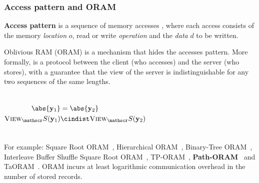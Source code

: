 	\begin{frame}[label={frame:appendix:oram}]

		\frametitle{Access pattern and ORAM}

		\justifying%

		\textbf{Access pattern} is a sequence of memory accesses \oramProgram{}, where each access consists of the memory \emph{location} $o$, read \oramRead{} or write \oramWrite{} \emph{operation} and the \emph{data} $d$ to be written.

		Oblivious RAM (ORAM) is a mechanism that hides the accesses pattern.
		More formally, \oram{} is a protocol between the client \client{} (who accesses) and the server \server{} (who stores), with a guarantee that the view of the server is indistinguishable for any two sequences of the same lengths.

		\begin{columns}[T]

				\[
					\begin{split}
						\abs{\oramProgram_1}					& = \abs{\oramProgram_2}							\\
						\textsc{View}_\server (\oramProgram_1)	& \cindist \textsc{View}_\server (\oramProgram_2)
					\end{split}
				\]



		\end{columns}

		\vspace*{1ex}

		For example: Square Root ORAM~\cite{oram-theory}, Hierarchical ORAM~\cite{oram-original}, Binary-Tree ORAM~\cite{binary-tree-oram}, Interleave Buffer Shuffle Square Root ORAM~\cite{shortest-path-oram}, TP-ORAM~\cite{tp-oram}, \textbf{Path-ORAM}~\cite{path-oram} and TaORAM~\cite{taostore}.
		\alert{ORAM incurs at least logarithmic communication overhead in the number of stored records.~\cite{oram-original}}

		\begin{flushright}
			\hyperlink{frame:epsolute-motivation}{}
		\end{flushright}

	\end{frame}

